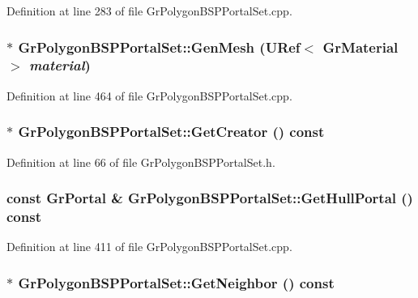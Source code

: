 Definition at line 283 of file GrPolygonBSPPortalSet.cpp.\hypertarget{class_gr_polygon_b_s_p_portal_set_bb6f1689a2f57169d9e5a41d2e664bc1}{
\subsubsection[{GenMesh}]{ $\ast$ GrPolygonBSPPortalSet::GenMesh ({\bf URef}$<$ {\bf GrMaterial} $>$ {\em material})}}
\label{class_gr_polygon_b_s_p_portal_set_bb6f1689a2f57169d9e5a41d2e664bc1}




Definition at line 464 of file GrPolygonBSPPortalSet.cpp.\hypertarget{class_gr_polygon_b_s_p_portal_set_c4ae6e28d3a43e9dea180ba4c1b05f47}{
\subsubsection[{GetCreator}]{$\ast$ GrPolygonBSPPortalSet::GetCreator () const}}
\label{class_gr_polygon_b_s_p_portal_set_c4ae6e28d3a43e9dea180ba4c1b05f47}




Definition at line 66 of file GrPolygonBSPPortalSet.h.\hypertarget{class_gr_polygon_b_s_p_portal_set_b93adfe1f6c1cd860044c8531a933d99}{
\subsubsection[{GetHullPortal}]{\setlength{\rightskip}{0pt plus 5cm}const {\bf GrPortal} \& GrPolygonBSPPortalSet::GetHullPortal () const}}
\label{class_gr_polygon_b_s_p_portal_set_b93adfe1f6c1cd860044c8531a933d99}




Definition at line 411 of file GrPolygonBSPPortalSet.cpp.\hypertarget{class_gr_polygon_b_s_p_portal_set_1828ab2d1236459003e49503672f4b6c}{
\subsubsection[{GetNeighbor}]{$\ast$ GrPolygonBSPPortalSet::GetNeighbor () const}}
\label{class_gr_polygon_b_s_p_portal_set_1828ab2d1236459003e49503672f4b6c}




